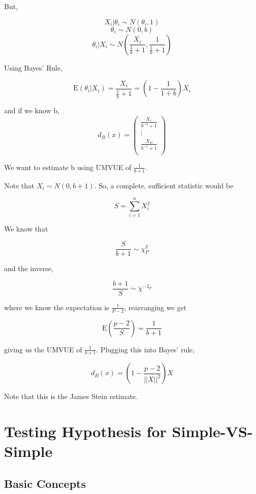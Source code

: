 \documentclass[11pt,fleqn]{book} %
\newcommand{\E}{\mathrm{E}}
\begin{document}
But, 

		$$X_i |\theta_i \sim N(\theta_i, 1) $$
		$$\theta_i \sim N(0, b) $$
		$$\theta_i |X_i \sim N\left(\frac{X_i}{\frac{1}{b} + 1}, \frac{1}{\frac{1}{b} + 1} \right) $$

Using Bayes' Rule, 

		$$\E (\theta_i | X_i) = \frac{X_i}{\frac{1}{b}+ 1} = (1 - {\frac{1}{1 + b}}) X_i $$

and if we know b, 
		$$d_B(x) = \begin{pmatrix}
			\frac{X_1}{b^{-1} + 1}\\
			\vdots\\
			\frac{X_P}{b^{-1} + 1}\\
		\end{pmatrix} $$


We want to estimate b using UMVUE of $\frac{1}{b + 1}$. 

Note that $X_i \sim N(0, b + 1)$. So, a complete, sufficient statistic would be

		$$S = \sum^n_{i = 1} X_i^2 $$

We know that

		$$\frac{S}{b+1} \sim \chi^{2}_P $$

and the inverse, 

		$$\frac{b + 1}{S} \sim \chi^{-2_P} $$

where we know the expectation is $\frac{1}{P- 2}$, rearranging we get 

		$$\E (\frac{p - 2}{S}) = \frac{1}{b+1}$$

giving us the UMVUE of $\frac{1}{b+ 1}$. Plugging this into Bayes' rule, 

		$$d_B(x) = (1 - \frac{p - 2}{||X||^2})X $$

Note that this is the James Stein estimate. 





\chapter{Testing Hypothesis for Simple-VS-Simple}

\section{Basic Concepts}
\end{document}

